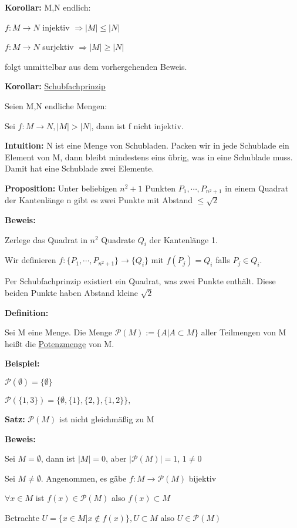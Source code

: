 \documentclass[pdftex,12pt,a4paper,fleqn]{scrartcl}
\begin{document}
\textbf{Korollar:} M,N endlich:

$f: M \rightarrow N$ injektiv $\Rightarrow |M| \leq |N|$

$f: M \rightarrow N$ surjektiv $\Rightarrow |M| \geq |N|$

folgt unmittelbar aus dem vorhergehenden Beweis.

\textbf{Korollar:} \underline{Schubfachprinzip}

Seien M,N endliche Mengen:

Sei $f: M \rightarrow N, |M| > |N|$, dann ist f nicht injektiv.

\textbf{Intuition:} N ist eine Menge von Schubladen. Packen wir in jede Schublade ein Element von M, dann bleibt mindestens eins übrig, was in eine Schublade muss. Damit hat eine Schublade zwei Elemente.

\textbf{Proposition:} Unter beliebigen $n^2+1$ Punkten $P_1,\cdots,P_{n^2+1}$ in einem Quadrat der Kantenlänge n gibt es zwei Punkte mit Abstand $\leq \sqrt{2}$

\textbf{Beweis:}

Zerlege das Quadrat in $n^2$ Quadrate $Q_i$ der Kantenlänge 1.

Wir definieren $f: \{P_1,\cdots,P_{n^2+1}\} \rightarrow \{Q_i\}$ mit $f(P_j) = Q_i$ falls $P_j \in Q_i$.

Per Schubfachprinzip existiert ein Quadrat, was zwei Punkte enthält. Diese beiden Punkte haben Abstand kleine $\sqrt{2}$

\newpage

\textbf{Definition:}

Sei M eine Menge. Die Menge $\mathcal{P}(M) := \{A | A \subset M\}$ aller Teilmengen von M heißt die \underline{Potenzmenge} von M.

\textbf{Beispiel:} 

$\mathcal{P}(\emptyset) = \{\emptyset\}$

$\mathcal{P}(\{1,3\}) = \{\emptyset,\{1\},\{2,\},\{1,2\}\},$

\textbf{Satz:} $\mathcal{P}(M)$ ist nicht gleichmäßig zu M

\textbf{Beweis:}

Sei $M = \emptyset$, dann ist $|M|=0$, aber $|\mathcal{P}(M)|=1$, $1\neq 0$

Sei $M \neq \emptyset$. Angenommen, es gäbe $f: M \rightarrow \mathcal{P}(M)$ bijektiv

$\forall x \in M$ ist $f(x) \in \mathcal{P}(M)$ also $f(x) \subset M$

Betrachte $U = \{x \in M | x \notin f(x)\}, U \subset M$ also $U \in \mathcal{P}(M)$
\end{document}
